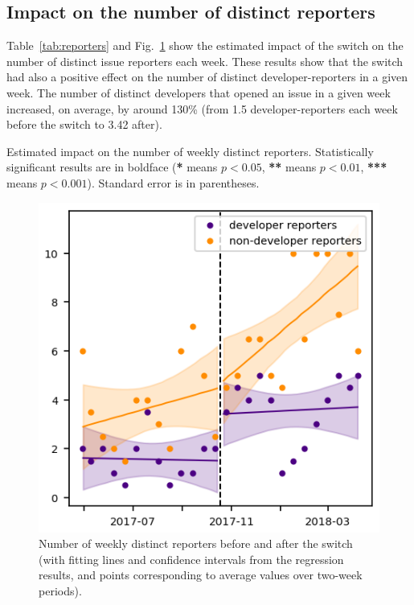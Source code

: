 \documentclass[conference]{IEEEtran}
\begin{document}
\subsection{Impact on the number of distinct reporters}

Table~\ref{tab:reporters} and Fig.~\ref{reporter_nb_rd} show the estimated impact of the switch on the number of distinct issue reporters each week. These results show that the switch had also a positive effect on the number of distinct developer-reporters in a given week. The number of distinct developers that opened an issue in a given week increased, on average, by around 130\% (from 1.5 developer-reporters each week before the switch to 3.42 after).

\begin{table}
\centering
\caption{Estimated impact on the number of weekly distinct reporters. Statistically significant results are in boldface (\textbf{*} means $p<0.05$, \textbf{**} means $p<0.01$, \textbf{***} means $p<0.001$). Standard error is in parentheses.}
\label{tab:reporters}

\end{table}

\begin{figure}
\includegraphics{reporter_nb_rd.png}
\caption{Number of weekly distinct reporters before and after the switch (with fitting lines and confidence intervals from the regression results, and points corresponding to average values over two-week periods).} \label{reporter_nb_rd}
\end{figure}
\end{document}
